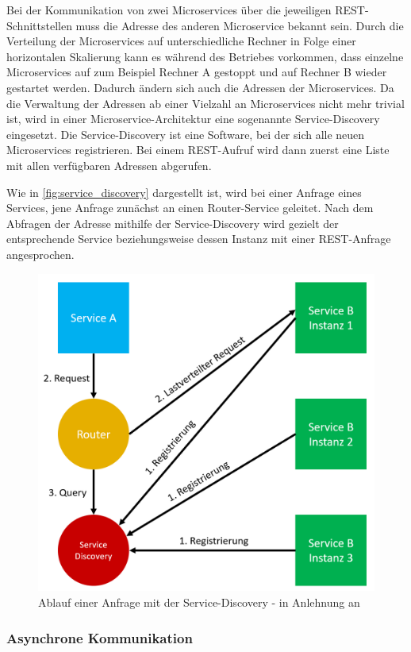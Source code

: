 \label{service_discovery}Bei der Kommunikation von zwei Microservices über die jeweiligen REST-Schnittstellen muss die Adresse des anderen Microservice bekannt sein. Durch die Verteilung der Microservices auf unterschiedliche Rechner in Folge einer horizontalen Skalierung kann es während des Betriebes vorkommen, dass einzelne Microservices auf zum Beispiel Rechner A gestoppt und auf Rechner B wieder gestartet werden. Dadurch ändern sich auch die Adressen der Microservices. Da die Verwaltung der Adressen ab einer Vielzahl an Microservices nicht mehr trivial ist, wird in einer Microservice-Architektur eine sogenannte Service-Discovery eingesetzt. Die Service-Discovery ist eine Software, bei der sich alle neuen Microservices registrieren. Bei einem REST-Aufruf wird dann zuerst eine Liste mit allen verfügbaren Adressen abgerufen.

Wie in \autoref{fig:service_discovery} dargestellt ist, wird bei einer Anfrage eines Services, jene Anfrage zunächst an einen Router-Service geleitet. Nach dem Abfragen der Adresse mithilfe der Service-Discovery wird gezielt der entsprechende Service beziehungsweise dessen Instanz mit einer REST-Anfrage angesprochen.

\begin{figure}[H]
    \centering
    \includegraphics[width=0.65\linewidth]{images/service-discovery.png}
    \caption{Ablauf einer Anfrage mit der Service-Discovery - in Anlehnung an \cite{MichaelSchwab.2019}}
    \label{fig:service_discovery}
\end{figure}

\subsubsection*{Asynchrone Kommunikation}

